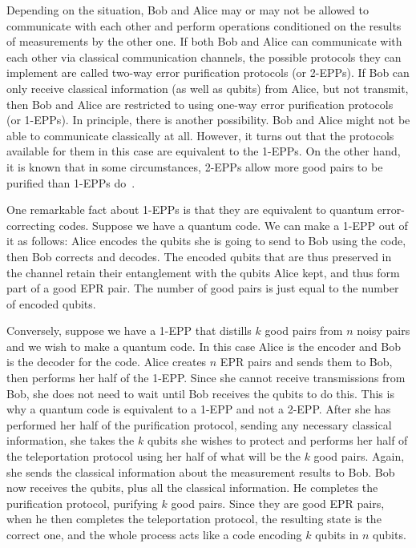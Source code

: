 Depending on the situation, Bob and Alice may or may not be allowed to
communicate with each other and perform operations conditioned on the
results of measurements by the other one.  If both Bob and Alice can
communicate with each other via classical communication channels, the
possible protocols they can implement are called two-way error purification
protocols (or 2-EPPs).  If Bob can only receive classical information (as well
as qubits) from Alice, but not transmit, then Bob and Alice are restricted to
using one-way error purification protocols (or 1-EPPs).  In principle, there is
another possibility.  Bob and Alice might not be able to communicate
classically at all.  However, it turns out that the protocols available for
them in this case are equivalent to the 1-EPPs.  On the other hand, it is
known that in some circumstances, 2-EPPs allow more good pairs to be
purified than 1-EPPs do~\cite{bennett-tome}.

One remarkable fact about 1-EPPs is that they are equivalent to
quantum error-correcting codes.  Suppose we have a quantum code.  We
can make a 1-EPP out of it as follows: Alice encodes the qubits she is going
to send to Bob using the code, then Bob corrects and decodes.  The encoded
qubits that are thus preserved in the channel retain their entanglement
with the qubits Alice kept, and thus form part of a good EPR pair.  The
number of good pairs is just equal to the number of encoded qubits.

Conversely, suppose we have a 1-EPP that distills $k$ good pairs from $n$
noisy pairs and we wish to make a quantum code.  In this case Alice is the
encoder and Bob is the decoder for the code.  Alice creates $n$ EPR pairs
and sends them to Bob, then performs her half of the 1-EPP.  Since she
cannot receive transmissions from Bob, she does not need to wait until Bob
receives the qubits to do this.  This is why a quantum code is equivalent to
a 1-EPP and not a 2-EPP.  After she has performed her half of the
purification protocol, sending any necessary classical information, she
takes the $k$ qubits she wishes to protect and performs her half of the
teleportation protocol using her half of what will be the $k$ good pairs.
Again, she sends the classical information about the measurement results
to Bob.  Bob now receives the qubits, plus all the classical information.  He
completes the purification protocol, purifying $k$ good pairs.  Since they
are good EPR pairs, when he then completes the teleportation protocol, the
resulting state is the correct one, and the whole process acts like a code
encoding $k$ qubits in $n$ qubits.

